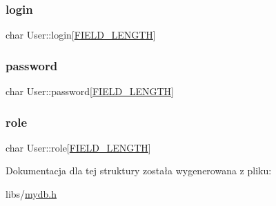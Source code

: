 \mbox{\label{structUser_a8771105ae412adbc4b211ea70d5a765a}} 
\subsubsection{\texorpdfstring{login}{login}}
{\footnotesize\ttfamily char User\+::login\mbox{[}\mbox{\hyperlink{mydb_8h_a4e8ecaf2d59499a8c159ccdf7be1baec}{F\+I\+E\+L\+D\+\_\+\+L\+E\+N\+G\+TH}}\mbox{]}}

\mbox{\label{structUser_a2e1494fae9c80908a5169c253321b08f}} 
\subsubsection{\texorpdfstring{password}{password}}
{\footnotesize\ttfamily char User\+::password\mbox{[}\mbox{\hyperlink{mydb_8h_a4e8ecaf2d59499a8c159ccdf7be1baec}{F\+I\+E\+L\+D\+\_\+\+L\+E\+N\+G\+TH}}\mbox{]}}

\mbox{\label{structUser_a1e6d9b3124f7a86d09aaecbd7a61e33b}} 
\subsubsection{\texorpdfstring{role}{role}}
{\footnotesize\ttfamily char User\+::role\mbox{[}\mbox{\hyperlink{mydb_8h_a4e8ecaf2d59499a8c159ccdf7be1baec}{F\+I\+E\+L\+D\+\_\+\+L\+E\+N\+G\+TH}}\mbox{]}}



Dokumentacja dla tej struktury została wygenerowana z pliku\+:\begin{DoxyCompactItemize}
\item 
libs/\mbox{\hyperlink{mydb_8h}{mydb.\+h}}\end{DoxyCompactItemize}
